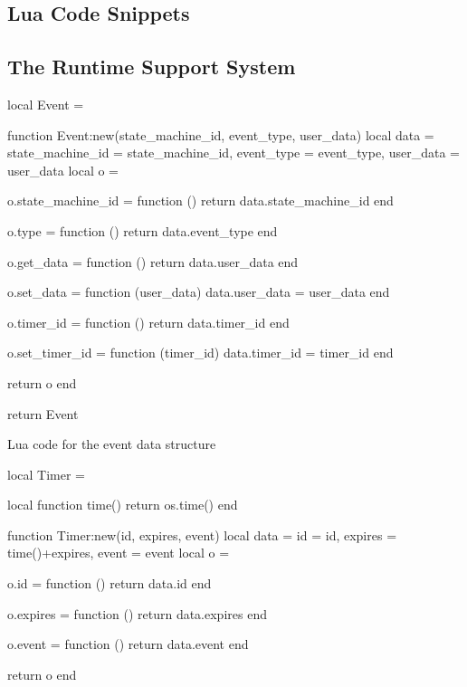 \begin{appendices}

\chapter{Lua Code Snippets}
\label{app:code}

\section{The Runtime Support System}
\label{code:rts}

\begin{listing}[htp]
\begin{luacode}
local Event = {}

function Event:new(state_machine_id, event_type, user_data)
	local data = {state_machine_id = state_machine_id, event_type = event_type,
	              user_data = user_data}
	local o = {}

	o.state_machine_id = function ()
		return data.state_machine_id
	end

	o.type = function ()
		return data.event_type
	end

	o.get_data = function ()
		return data.user_data
	end

	o.set_data = function (user_data)
		data.user_data = user_data
	end

	o.timer_id = function ()
		return data.timer_id
	end

	o.set_timer_id = function (timer_id)
		data.timer_id = timer_id
	end

	return o
end

return Event
\end{luacode}
	\caption{Lua code for the event data structure }
	\label{code:event}
\end{listing}

\begin{listing}[htp]
\begin{luacode}
local Timer = {}

local function time()
	return os.time()
end

function Timer:new(id, expires, event)
	local data = {id = id, expires = time()+expires, event = event}
	local o = {}

	o.id = function ()
		return data.id
	end

	o.expires = function ()
		return data.expires
	end

	o.event = function ()
		return data.event
	end

	return o
end


\end{luacode}
\end{listing}
\end{appendices}

